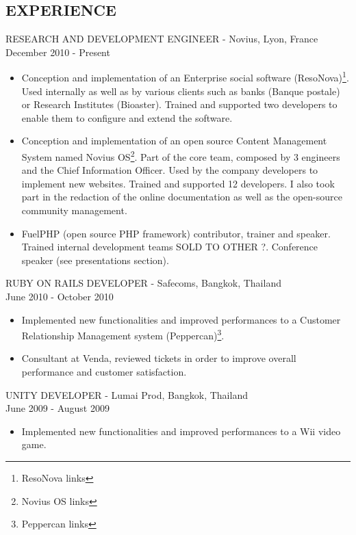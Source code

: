 \documentclass[11pt]{res} %
\begin{document}
\begin{resume}
\section{EXPERIENCE} 
 RESEARCH AND DEVELOPMENT ENGINEER - Novius, Lyon, France \\
December 2010 - Present
\vspace{0.05in}
   \begin{itemize} \itemsep -2pt  %
   \item Conception and implementation of an Enterprise social software (ResoNova)\footnote{ResoNova links}.
Used internally as well as by various clients such as banks (Banque postale) or
Research Institutes (Bioaster). Trained and supported two developers to enable them
to configure and extend the software.
   \item Conception and implementation of an open source Content Management System named Novius OS\footnote{Novius OS links}.
Part of the core team, composed by 3 engineers and the Chief Information Officer. Used by the company
developers to implement new websites. Trained and supported 12 developers. I also took part in the redaction
of the online documentation as well as the open-source community management.
   \item FuelPHP (open source PHP framework) contributor, trainer and speaker. Trained internal development teams SOLD TO OTHER ?.
Conference speaker (see presentations section).
 \end{itemize}

RUBY ON RAILS DEVELOPER - Safecoms, Bangkok, Thailand \\ 
June 2010 - October 2010
\vspace{0.05in}
 \begin{itemize} \itemsep -2pt
   \item Implemented new functionalities and improved performances to a Customer Relationship Management system (Peppercan)\footnote{Peppercan links}.
  \item  Consultant at Venda, reviewed tickets in order to improve overall performance and customer satisfaction.
\end{itemize} 

UNITY DEVELOPER - Lumai Prod, Bangkok, Thailand \\ 
June 2009 - August 2009
\vspace{0.05in}
 \begin{itemize} \itemsep -2pt
   \item Implemented new functionalities and improved performances to a Wii video game.
\end{itemize} 


\end{resume}
\end{document}
